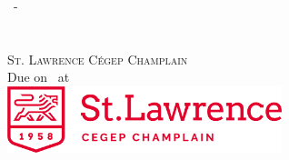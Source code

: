 \begin{titlepage}
	\begin{center}
		\vspace*{0.5in}
		\LARGE{\textsc{\docTitle}}\\
		\vspace*{0.1in}
		\Large{\textsc{\docSubTitle}}\\
		\vfill
		\Large{\textsc{\docAuthorTitlePage}}\\
		\vspace*{0.1in}
		\Large{\textsc{\docClass\ -\ \docClassNumber}}\\
		\vfill
		\Large{\docClassTime}\\
		\vspace*{0.1in}
		\large{\textsc{\docClassInstructor}}\\
		\vfill
		\large{\textsc{St. Lawrence Cégep Champlain}}\\
		\vspace*{0.1in}
		\small{Due on \docDueDate\ at \docDueTime}\\
		\vfill
		\includegraphics[width=0.6\textwidth]{../images/Title_page_logo.png}
		\vfill
	\end{center}
\end{titlepage}
\pagebreak